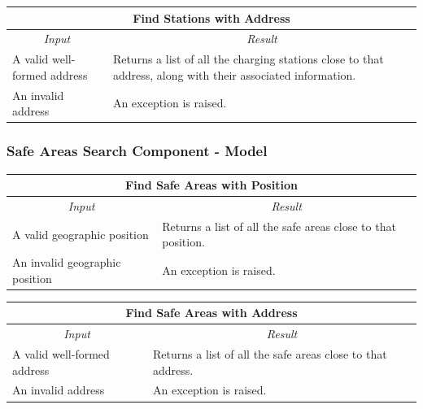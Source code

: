 \documentclass[english]{article}
\begin{document}
\begin{center}
	\begin{tabular}{ | p{6cm} | p{6cm} | }
		\hline 
		\multicolumn{2}{|c|}{\textbf{Find Stations with Address}} \\
		\hline
		\multicolumn{1}{|c|}{\textit{Input}} & \multicolumn{1}{c|}{\textit{Result}} \\
		\hline
		A valid well-formed address & Returns a list of all the charging stations close to that address, along with their associated information. \\
		\hline
		An invalid address & An exception is raised. \\
		\hline
	\end{tabular}
\end{center}

\subsubsection{Safe Areas Search Component - Model}

\begin{center}
	\begin{tabular}{ | p{6cm} | p{6cm} | }
		\hline 
		\multicolumn{2}{|c|}{\textbf{Find Safe Areas with Position}} \\
		\hline
		\multicolumn{1}{|c|}{\textit{Input}} & \multicolumn{1}{c|}{\textit{Result}} \\
		\hline
		A valid geographic position & Returns a list of all the safe areas close to that position. \\
		\hline
		An invalid geographic position & An exception is raised. \\
		\hline
	\end{tabular}
\end{center}

\begin{center}
	\begin{tabular}{ | p{6cm} | p{6cm} | }
		\hline 
		\multicolumn{2}{|c|}{\textbf{Find Safe Areas with Address}} \\
		\hline
		\multicolumn{1}{|c|}{\textit{Input}} & \multicolumn{1}{c|}{\textit{Result}} \\
		\hline
		A valid well-formed address & Returns a list of all the safe areas close to that address. \\
		\hline
		An invalid address & An exception is raised. \\
		\hline
	\end{tabular}
\end{center}
\end{document}
